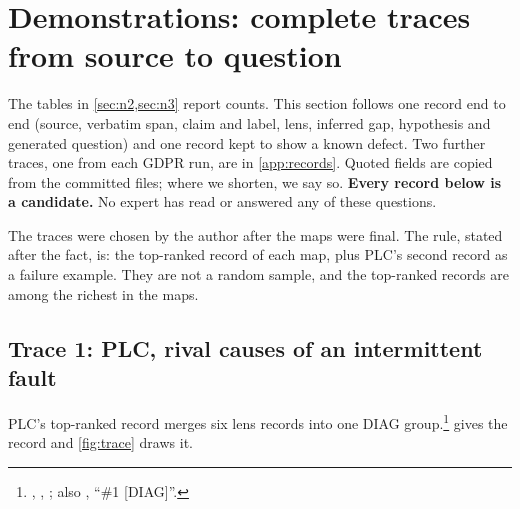 \section{Demonstrations: complete traces from source to question}
\label{sec:demos}

The tables in \cref{sec:n2,sec:n3} report counts. This section follows one record end to end
(source, verbatim span, claim and label, lens, inferred gap, hypothesis and generated question) and
one record kept to show a known defect. Two further traces, one from each GDPR run, are in
\cref{app:records}. Quoted fields are copied from the committed  files; where we
shorten, we say so. \textbf{Every record below is a candidate.} No expert has read or answered any of
these questions.

\evobs{} The traces were chosen by the author after the maps were final. The rule, stated after the
fact, is: the top-ranked record of each map, plus PLC's second record as a failure example. They are
not a random sample, and the top-ranked records are among the richest in the maps.

\subsection{Trace 1: PLC, rival causes of an intermittent fault}

PLC's top-ranked record merges six lens records into one DIAG group.\footnote{,
,  ; also ,
\enquote{\#1 [DIAG]}.}  gives the record and \cref{fig:trace} draws it.

